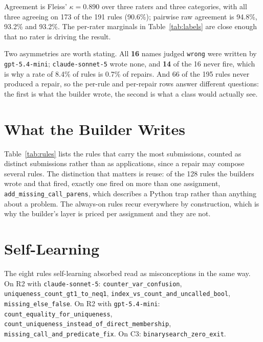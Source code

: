 \documentclass[letterpaper]{article}
\begin{document}
Agreement is Fleiss' $\kappa = 0.890$ over three raters and three categories,
with all three agreeing on 173 of the 191 rules (90.6\%); pairwise raw
agreement is 94.8\%, 93.2\% and 93.2\%. The per-rater marginals in
Table~\ref{tab:labels} are close enough that no rater is driving the result.

Two asymmetries are worth stating. All \textbf{16} names judged \texttt{wrong}
were written by \texttt{gpt-5.4-mini}; \texttt{claude-sonnet-5} wrote none, and
\textbf{14} of the 16 never fire, which is why a rate of 8.4\% of rules is
0.7\% of repairs. And 66 of the 195 rules never produced a repair, so the
per-rule and per-repair rows answer different questions: the first is what the
builder wrote, the second is what a class would actually see.

\section{What the Builder Writes}

Table~\ref{tab:rules} lists the rules that carry the most submissions, counted
as distinct submissions rather than as applications, since a repair may compose
several rules. The distinction that matters is reuse: of the 128 rules the
builders wrote and that fired, exactly one fired on more than one assignment,
\texttt{add\_missing\_call\_parens}, which describes a Python trap rather than
anything about a problem. The always-on rules recur everywhere by construction,
which is why the builder's layer is priced per assignment and they are not.

\begin{table}[h]
\centering\scriptsize\setlength{\tabcolsep}{3pt}
\resizebox{\columnwidth}{!}{}
\caption{The eight rules repairing the most submissions.}
\label{tab:rules}
\end{table}

\section{Self-Learning}

\begingroup\sloppy
The eight rules self-learning absorbed read as misconceptions in the same way.
On R2 with \texttt{claude-sonnet-5}: \texttt{counter\_var\_confusion},
\texttt{uniqueness\_\allowbreak count\_gt1\_to\_neq1},
\texttt{index\_vs\_count\_\allowbreak and\_uncalled\_bool},
\texttt{missing\_else\_false}. On R2 with \texttt{gpt-5.4-mini}:
\texttt{count\_equality\_for\_uniqueness},
\texttt{count\_uniqueness\_\allowbreak instead\_of\_\allowbreak direct\_membership},
\texttt{missing\_call\_\allowbreak and\_predicate\_fix}. On C3:
\texttt{binarysearch\_zero\_exit}.
\endgroup
\end{document}
